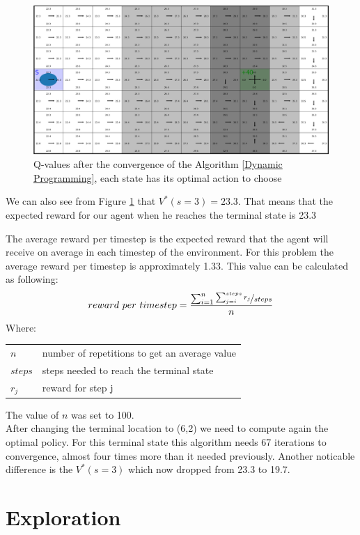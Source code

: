 \documentclass{article}
\makeatletter
\newenvironment{conditions}
  {\par\vspace{\abovedisplayskip}\noindent\begin{tabular}{>{$}l<{$} @{${}={}$} l}}
  {\end{tabular}\par\vspace{\belowdisplayskip}}
\makeatother
\begin{document}
\begin{figure}[H]
    \centering
    \includegraphics[scale=0.17]{images/Qvalue-last-iteration.png}
    \caption{Q-values after the convergence of the Algorithm \ref{Dynamic Programming}, each state has its optimal action to choose}
    \label{fig:Final State}
\end{figure}
We can also see from Figure \ref{fig:Final State} that $V^*(s=3)=23.3$. That means that the expected reward for our agent when he reaches the terminal state is 23.3

The average reward per timestep is the expected reward that the agent will receive on average in each timestep of the environment.
For this problem the average reward per timestep is  approximately 1.33. This value can be calculated as following:
\begin{equation}
    reward\ per\ timestep = \frac{\sum_{i=1}^{n}\nicefrac{\sum_{j=i}^{steps}r_j}{steps}}{n}
\end{equation}
Where:
\begin{conditions}
    n     &  number of repetitions to get an average value \\
    steps     &  steps needed to reach the terminal state \\   
    r_{j} &  reward for step j
\end{conditions}
The value of $n$ was set to 100.\\

After changing the terminal location to (6,2) we need to compute again the optimal policy. For this terminal state this algorithm
needs 67 iterations to convergence, almost four times more than it needed previously.
Another noticable difference is the $V^*(s=3)$ which now dropped from 23.3 to 19.7.

\section{Exploration} \label{sec:Exploration}
\end{document}
